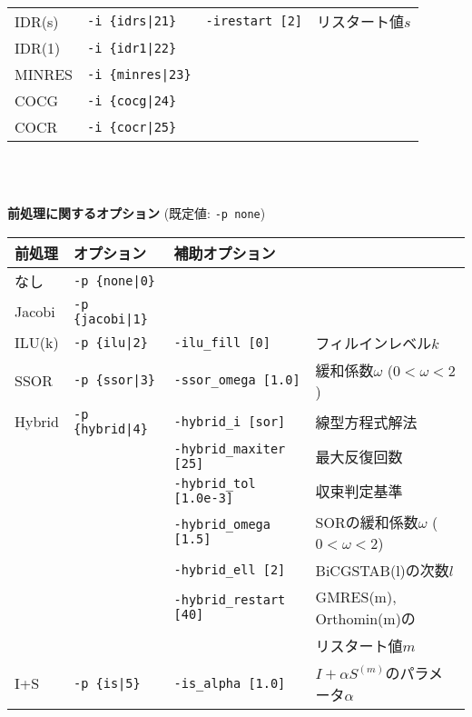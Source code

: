 \documentclass[a4paper]{jarticle}
\begin{document}
{{\begin{minipage}[t]{\textwidth}
\begin{center}
\begin{tabular}{l|lll}
 IDR(s)      & \verb=-i {idrs|21}=      & \verb=-irestart [2]= & リスタート値$s$  \\
 IDR(1)      & \verb=-i {idr1|22}=      &    \\
 MINRES      & \verb=-i {minres|23}=    &    \\
 COCG        & \verb=-i {cocg|24}=      &    \\
 COCR        & \verb=-i {cocr|25}=      &    \\   
\hline         
\end{tabular}
\end{center}
\end{minipage}
\\ \\
\begin{minipage}[t]{\textwidth}
\begin{center}
{\bf 前処理に関するオプション} (既定値: \verb=-p none=) \\
\begin{tabular}{l|lll}\hline\hline
前処理   & オプション           & 補助オプション \\ \hline
なし     & \verb=-p {none|0}=    &   \\
Jacobi   & \verb=-p {jacobi|1}=  &     \\
ILU(k)   & \verb=-p {ilu|2}=     & \verb=-ilu_fill [0]=    & フィルインレベル$k$ \\
SSOR     & \verb=-p {ssor|3}=    & \verb=-ssor_omega [1.0]=    & 緩和係数$\omega$ ($0<\omega<2$) \\
Hybrid   & \verb=-p {hybrid|4}=  & \verb=-hybrid_i [sor]=  & 線型方程式解法 \\
         &                       & \verb=-hybrid_maxiter [25]= & 最大反復回数 \\
         &                       & \verb=-hybrid_tol [1.0e-3]= & 収束判定基準 \\
         &                       & \verb=-hybrid_omega [1.5]=  & SORの緩和係数$\omega$ ($0<\omega<2$) \\
         &                       & \verb=-hybrid_ell [2]=      & BiCGSTAB(l)の次数$l$\\
         &                       & \verb=-hybrid_restart [40]= & GMRES(m), Orthomin(m)の \\
         &                       &                             & リスタート値$m$ \\
I+S      & \verb=-p {is|5}=      & \verb=-is_alpha [1.0]=  & $I+\alpha S^{(m)}$のパラメータ$\alpha$ \\

\end{tabular}
\end{center}
\end{minipage}}}
\end{document}
